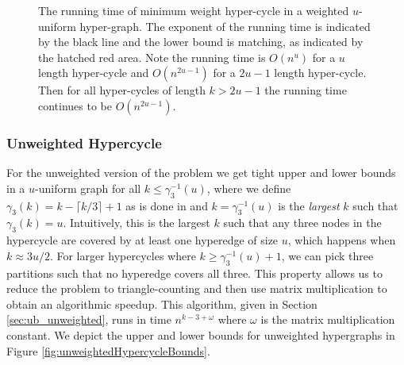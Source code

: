 \documentclass[11pt,letterpaper,pdftex]{article}
\begin{document}
\begin{figure} [ht]
    \centering
    \caption{The running time of minimum weight hyper-cycle in a weighted $u$-uniform hyper-graph. The exponent of the running time is indicated by the black line and the lower bound is matching, as indicated by the hatched red area. Note the running time is $O(n^u)$ for a $u$ length hyper-cycle and $O(n^{2u-1})$ for a $2u-1$ length hyper-cycle. Then for all hyper-cycles of length $k>2u-1$ the running time continues to be $O(n^{2u-1})$.}
    \label{fig:weightedHypercycleBounds}
\end{figure}

\subsubsection{Unweighted Hypercycle} 

For the unweighted version of the problem we get tight upper and lower bounds in a $u$-uniform graph for all $k \leq \gamma_3^{-1}(u)$, where we define $ \gamma_3(k) = k-\lceil k/3 \rceil +1$ as is done in \cite{LVW18} and $k = \gamma_3^{-1}(u)$ is the \emph{largest} $k$ such that $\gamma_3(k)=u$.
Intuitively, this is the largest $k$ such that any three nodes in the hypercycle are covered by at least one hyperedge of size $u$, which happens when $k \approx 3u/2$. 
For larger hypercycles where $k \geq \gamma_3^{-1}(u)+1$, we can pick three partitions such that no hyperedge covers all three. 
This property allows us to reduce the problem to triangle-counting and then use matrix multiplication to obtain an algorithmic speedup.
This algorithm, given in Section \ref{sec:ub_unweighted}, runs in time $n^{k-3+\omega}$ where $\omega$ is the matrix multiplication constant. 
We depict the upper and lower bounds for unweighted hypergraphs in Figure \ref{fig:unweightedHypercycleBounds}.
\end{document}
